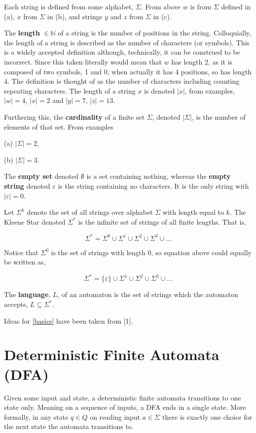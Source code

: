 \documentclass[a4paper,12pt]{report}
\theoremstyle{definition}
\begin{document}
Each string is defined from some alphabet, $\Sigma$. From above $w$ is from $\Sigma $  defined in (a), $x$ from $\Sigma$ in (b), and strings $y$ and $z$ from  $\Sigma$ in (c).

The \textbf{length} $\in\mathbb{N}$ of a string is the number of positions in the string. Colloquially, the length of a string is described as the number of characters (or symbols). This is a widely accepted definition although, technically, it can be construed to be incorrect. Since this taken literally would mean that $w$ has length 2, as it is composed of two symbols, 1 and 0, when actually it has 4 positions, so has length 4. The definition is thought of as the number of characters including counting repeating characters. The length of a string $x$ is  denoted  $|x|$, from examples, $|w|=4$, $|x|=2$ and $|y|=7$, $|z|=13$. 

Furthering this, the \textbf{cardinality} of a finite set $\Sigma$, denoted $|\Sigma|$, is the number of elements of that set. From examples 
\begin{enumerate*}
\item[(a)] $|\Sigma|=2$,
\item[(b)] $|\Sigma|=3$.
\end{enumerate*}


The \textbf{empty set} denoted $\emptyset$ is a set containing nothing, whereas the \textbf{empty string} denoted $\varepsilon$ is the string containing no characters. It is the only string with $|\varepsilon|=0$. 

Let $\Sigma^k$ denote the set of all strings over alphabet $\Sigma$ with length equal to $k$. The Kleene Star denoted $\Sigma^*$ is the infinite set of strings of all finite lengths. That is, 

$$\Sigma^* = \Sigma^0 \cup \Sigma^1 \cup \Sigma^2 \cup \Sigma^3 \cup ...$$

Notice that $\Sigma^0$ is the set of strings with length 0, so equation above could equally be written as,

$$\Sigma^* = \{\varepsilon\} \cup \Sigma^1 \cup \Sigma^2 \cup \Sigma^3 \cup ...$$

The \textbf{language}, $L$, of an automaton is the set of strings which the automaton accepts, $L \subseteq \Sigma^*$.

Ideas for \ref{basics} have been taken from [1]. 

\section{Deterministic Finite Automata (DFA)}
\label{DFA}
Given some input and state, a deterministic finite automata transitions to one state only. Meaning on a sequence of inputs, a DFA ends in a single state. More formally, in any state $q\in Q$  on reading input $a\in \Sigma$ there is exactly one choice for the next state the automata transitions to. 
\end{document}
